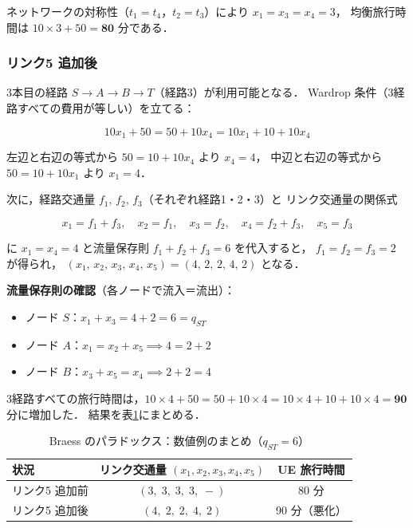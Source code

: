 ネットワークの対称性（$t_1 = t_4$，$t_2 = t_3$）により $x_1 = x_3 = x_4 = 3$，
均衡旅行時間は $10 \times 3 + 50 = \mathbf{80}$ 分である．

\subsubsection*{リンク5 追加後}

3本目の経路 $S \to A \to B \to T$（経路3）が利用可能となる．
Wardrop 条件（3経路すべての費用が等しい）を立てる：

\begin{equation}
  10 x_1 + 50
  = 50 + 10 x_4
  = 10 x_1 + 10 + 10 x_4
  \label{eq:braess-after-ue}
\end{equation}

左辺と右辺の等式から $50 = 10 + 10 x_4$ より $x_4 = 4$，
中辺と右辺の等式から $50 = 10 + 10 x_1$ より $x_1 = 4$．

次に，経路交通量 $f_1,\,f_2,\,f_3$（それぞれ経路1・2・3）と
リンク交通量の関係式

\begin{equation}
  x_1 = f_1 + f_3, \quad
  x_2 = f_1, \quad
  x_3 = f_2, \quad
  x_4 = f_2 + f_3, \quad
  x_5 = f_3
  \label{eq:braess-link-flow}
\end{equation}

に $x_1 = x_4 = 4$ と流量保存則 $f_1 + f_2 + f_3 = 6$ を代入すると，
$f_1 = f_2 = f_3 = 2$ が得られ，
$(x_1,\, x_2,\, x_3,\, x_4,\, x_5) = (4,\, 2,\, 2,\, 4,\, 2)$ となる．

\textbf{流量保存則の確認}（各ノードで流入＝流出）：

\begin{itemize}
  \item ノード $S$：$x_1 + x_3 = 4+2 = 6 = q_{ST}$ \checkmark
  \item ノード $A$：$x_1 = x_2 + x_5 \implies 4 = 2+2$ \checkmark
  \item ノード $B$：$x_3 + x_5 = x_4 \implies 2+2 = 4$ \checkmark
\end{itemize}

3経路すべての旅行時間は，$10\times4+50 = 50+10\times4 = 10\times4+10+10\times4 = \mathbf{90}$ 分に増加した．
結果を表\ref{tab:braess-result}にまとめる．

\begin{table}[hbtp]
  \centering
  \caption{Braess のパラドックス：数値例のまとめ（$q_{ST}=6$）}
  \label{tab:braess-result}
  \begin{tabular}{lcc}
    \toprule
    状況 & リンク交通量 $(x_1,x_2,x_3,x_4,x_5)$ & UE 旅行時間 \\
    \midrule
    リンク5 追加前 & $(3,\;3,\;3,\;3,\;-)$ & 80 分 \\
    リンク5 追加後 & $(4,\;2,\;2,\;4,\;2)$ & 90 分（悪化） \\
    \bottomrule
  \end{tabular}
\end{table}

